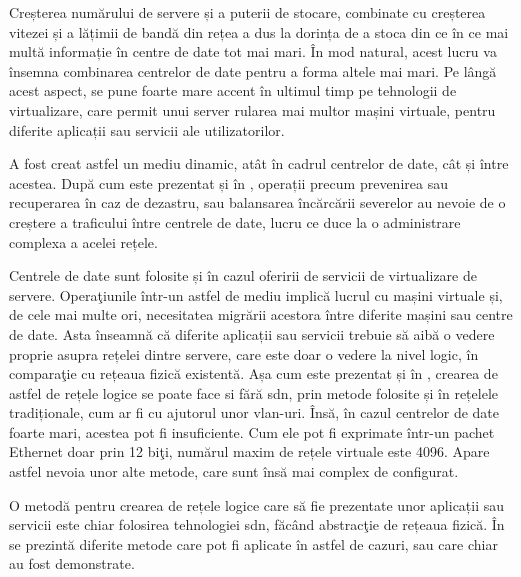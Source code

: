 Creșterea numărului de servere și a puterii de stocare, combinate cu creșterea vitezei și a lățimii de bandă din rețea a dus la dorința de a stoca din ce în ce mai multă informație în centre de date tot mai mari. În mod natural, acest lucru va însemna combinarea centrelor de date pentru a forma altele mai mari. Pe lângă acest aspect, se pune foarte mare accent în ultimul timp pe tehnologii de virtualizare, care permit unui server rularea mai multor mașini virtuale, pentru diferite aplicații sau servicii ale utilizatorilor.

A fost creat astfel un mediu dinamic, atât în cadrul centrelor de date, cât și între acestea. După cum este prezentat și în \cite{onf_openflow_backbone2012}, operații precum prevenirea sau recuperarea în caz de dezastru, sau balansarea încărcării severelor au nevoie de o creștere a traficului între centrele de date, lucru ce duce la o administrare complexa a acelei rețele.

Centrele de date sunt folosite și în cazul oferirii de servicii de virtualizare de servere. Operaţiunile într-un astfel de mediu implică lucrul cu mașini virtuale și, de cele mai multe ori, necesitatea migrării acestora între diferite mașini sau centre de date. Asta înseamnă că diferite aplicații sau servicii trebuie să aibă o vedere proprie asupra rețelei dintre servere, care este doar o vedere la nivel logic, în comparaţie cu rețeaua fizică existentă. Așa cum este prezentat și în \cite{nadeau2013sdn}, crearea de astfel de rețele logice se poate face si fără \gls{sdn}, prin metode folosite și în rețelele tradiționale, cum ar fi cu ajutorul unor \gls{vlan}-uri. Însă, în cazul centrelor de date foarte mari, acestea pot fi insuficiente. Cum ele pot fi exprimate într-un pachet Ethernet doar prin 12 biţi, numărul maxim de rețele virtuale este 4096. Apare astfel nevoia unor alte metode, care sunt însă mai complex de configurat.

O metodă pentru crearea de rețele logice care să fie prezentate unor aplicații sau servicii este chiar folosirea tehnologiei \gls{sdn}, făcând abstracţie de rețeaua fizică. În \cite{onf_openflow_backbone2012, onf_sdn_datacenter2013, liu2014sdn, munoz2015integrated} se prezintă diferite metode care pot fi aplicate în astfel de cazuri, sau care chiar au fost demonstrate.


